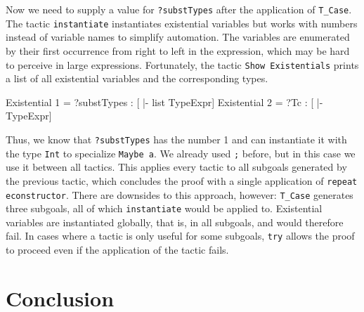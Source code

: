 \documentclass[paper = a4, fleqn, abstract=on, twoside]{scrreprt}
\newcommand{\todo}[1]{\marginpar{\textbf{TODO:} #1}}
\begin{document}
\par
Now we need to supply a value for \texttt{?substTypes} after the application of \texttt{T\_Case}. The tactic \texttt{instantiate} instantiates existential variables but works with numbers instead of variable names to simplify automation. The variables are enumerated by their first occurrence from right to left in the expression, which may be hard to perceive in large expressions. Fortunately, the tactic \texttt{Show Existentials} prints a list of all existential variables and the corresponding types.
\begin{coqcode}
Existential 1 = ?substTypes : [ |- list TypeExpr] 
Existential 2 = ?Tc : [ |- TypeExpr] 
\end{coqcode}
Thus, we know that \texttt{?substTypes} has the number 1 and can instantiate it with the type \texttt{Int} to specialize \texttt{Maybe a}. We already used \texttt{;} before, but in this case we use it between all tactics. This applies every tactic to all subgoals generated by the previous tactic, which concludes the proof with a single application of \texttt{repeat econstructor}. There are downsides to this approach, however: \texttt{T\_Case} generates three subgoals, all of which \texttt{instantiate} would be applied to. Existential variables are instantiated globally, that is, in all subgoals, and would therefore fail. In cases where a tactic is only useful for some subgoals, \texttt{try} allows the proof to proceed even if the application of the tactic fails.
\chapter{Conclusion}

\appendix



\end{document}
